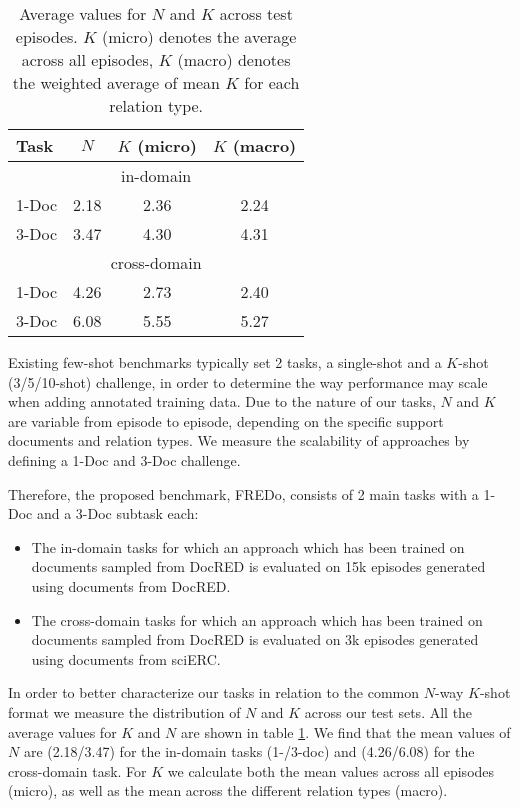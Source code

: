 \documentclass[11pt]{article}
\begin{document}
\begin{table}
\centering
\begin{tabular}{lccc}
Task & $N$ & $K$ (micro) & $K$ (macro) \\
\hline
\multicolumn{4}{c}{in-domain}\\
\hline
1-Doc & 2.18 & 2.36 & 2.24 \\
3-Doc & 3.47 & 4.30 & 4.31 \\
\hline
\multicolumn{4}{c}{cross-domain}\\
\hline

1-Doc & 4.26 & 2.73 & 2.40 \\
3-Doc & 6.08 & 5.55 & 5.27 \\
\hline
\end{tabular}
\caption{\label{tab:n-k-dist-per-rt} Average values for $N$ and $K$ across test episodes. $K$ (micro) denotes the average across all episodes, $K$ (macro) denotes the weighted average of mean $K$ for each relation type.}
\end{table}

Existing few-shot benchmarks typically set 2 tasks, a single-shot and a $K$-shot (3/5/10-shot) challenge, in order to determine the way performance may scale when adding annotated training data.
Due to the nature of our tasks, $N$ and $K$ are variable from episode to episode, depending on the specific support documents and relation types.
We measure the scalability of approaches by defining a 1-Doc and 3-Doc challenge.

Therefore, the proposed benchmark, FREDo, consists of 2 main tasks with a 1-Doc and a 3-Doc subtask each:
\begin{itemize}
    \item The in-domain tasks for which an approach which has been trained on documents sampled from DocRED is evaluated on 15k episodes generated using documents from DocRED.
    \item The cross-domain tasks for which an approach which has been trained on documents sampled from DocRED is evaluated on 3k episodes generated using documents from sciERC.
\end{itemize}

In order to better characterize our tasks in relation to the common $N$-way $K$-shot format we measure the distribution of $N$ and $K$ across our test sets.
All the average values for $K$ and $N$ are shown in table \ref{tab:n-k-dist-per-rt}.
We find that the mean values of $N$ are (2.18/3.47) for the in-domain tasks (1-/3-doc) and (4.26/6.08) for the cross-domain task. For $K$ we calculate both the mean values across all episodes (micro), as well as the mean across the different relation types (macro).
\end{document}
